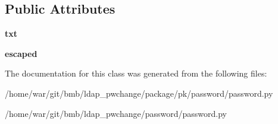 \subsection*{Public Attributes}
\begin{DoxyCompactItemize}
\item 
\hypertarget{classpassword_1_1password_1_1EscapedPart_af85d9281da5f007ce53ebb24cef34e55}{{\bfseries txt}}\label{classpassword_1_1password_1_1EscapedPart_af85d9281da5f007ce53ebb24cef34e55}

\item 
\hypertarget{classpassword_1_1password_1_1EscapedPart_a68a915571f1632854c640ff08a0c03ca}{{\bfseries escaped}}\label{classpassword_1_1password_1_1EscapedPart_a68a915571f1632854c640ff08a0c03ca}

\end{DoxyCompactItemize}


The documentation for this class was generated from the following files\-:\begin{DoxyCompactItemize}
\item 
/home/war/git/bmb/ldap\-\_\-pwchange/package/pk/password/password.\-py\item 
/home/war/git/bmb/ldap\-\_\-pwchange/password/password.\-py\end{DoxyCompactItemize}
